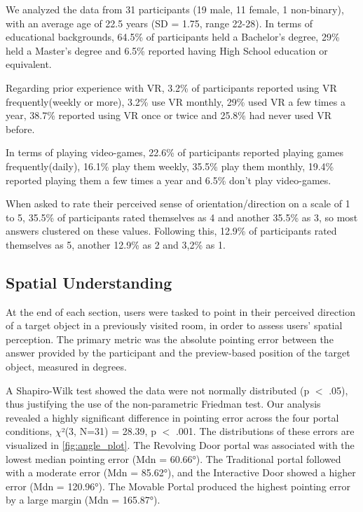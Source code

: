 We analyzed the data from 31 participants (19 male, 11 female, 1 non-binary), with an average age of 22.5 years (SD = 1.75, range 22-28). In terms of educational backgrounds, 64.5\% of participants held a Bachelor's degree, 29\% held a Master’s degree and 6.5\% reported having High School education or equivalent.

Regarding prior experience with \gls{VR}, 3.2\% of participants reported using \gls{VR} frequently(weekly or more), 3.2\% use \gls{VR} monthly, 29\% used \gls{VR} a few times a year, 38.7\% reported using \gls{VR} once or twice and 25.8\% had never used \gls{VR} before.

In terms of playing video-games, 22.6\% of participants reported playing games frequently(daily), 16.1\% play them weekly, 35.5\% play them monthly, 19.4\% reported playing them a few times a year and 6.5\% don't play video-games.

When asked to rate their perceived sense of orientation/direction on a scale of 1 to 5, 35.5\% of participants rated themselves as 4 and another 35.5\% as 3, so most answers clustered on these values. Following this, 12.9\% of participants rated themselves as 5, another 12.9\% as 2 and 3,2\% as 1.


\subsection{Spatial Understanding}

At the end of each section, users were tasked to point in their perceived direction of a target object in a previously visited room, 
in order to assess users' spatial perception. The primary metric was the absolute pointing error between the answer provided by the 
participant and the preview-based position of the target object, measured in degrees.

A Shapiro-Wilk test showed the data were not normally distributed (p $<$ .05), thus justifying the use of the non-parametric 
Friedman test. Our analysis revealed a highly significant difference in pointing error across the four portal conditions, 
$\chi$²(3, N=31) = 28.39, p $<$ .001. The distributions of these errors are visualized in \autoref{fig:angle_plot}. 
The Revolving Door portal was associated with the lowest median pointing error (Mdn = 60.66°). The Traditional portal 
followed with a moderate error (Mdn = 85.62°), and the Interactive Door showed a higher error (Mdn = 120.96°). 
The Movable Portal produced the highest pointing error by a large margin (Mdn = 165.87°).

